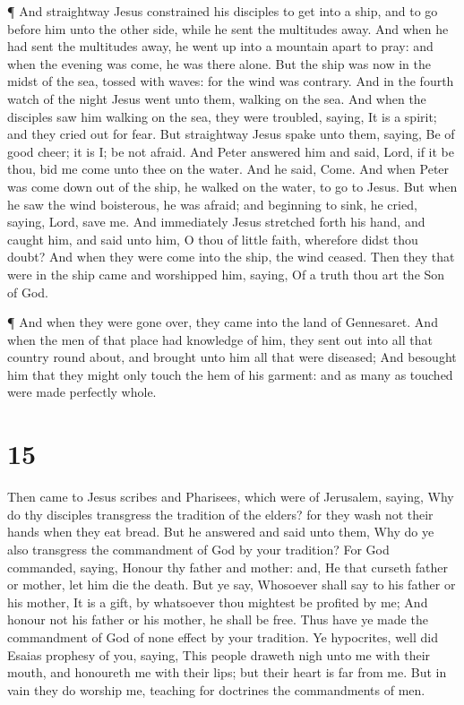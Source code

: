  ¶ And straightway Jesus constrained his disciples to get
into a ship, and to go before him unto the other side, while he sent the
multitudes away.  And when he had sent the multitudes away,
he went up into a mountain apart to pray: and when the evening was come,
he was there alone.  But the ship was now in the midst of
the sea, tossed with waves: for the wind was contrary.  And
in the fourth watch of the night Jesus went unto them, walking on the
sea.  And when the disciples saw him walking on the sea,
they were troubled, saying, It is a spirit; and they cried out for fear.
 But straightway Jesus spake unto them, saying, Be of good
cheer; it is I; be not afraid.  And Peter answered him and
said, Lord, if it be thou, bid me come unto thee on the water.
 And he said, Come. And when Peter was come down out of the
ship, he walked on the water, to go to Jesus.  But when he
saw the wind boisterous, he was afraid; and beginning to sink, he cried,
saying, Lord, save me.  And immediately Jesus stretched
forth his hand, and caught him, and said unto him, O thou of little
faith, wherefore didst thou doubt?  And when they were come
into the ship, the wind ceased.  Then they that were in the
ship came and worshipped him, saying, Of a truth thou art the Son of
God.

 ¶ And when they were gone over, they came into the land of
Gennesaret.  And when the men of that place had knowledge
of him, they sent out into all that country round about, and brought
unto him all that were diseased;  And besought him that
they might only touch the hem of his garment: and as many as touched
were made perfectly whole.

\hypertarget{section-14}{%
\section{15}\label{section-14}}

 Then came to Jesus scribes and Pharisees, which were of
Jerusalem, saying,  Why do thy disciples transgress the
tradition of the elders? for they wash not their hands when they eat
bread.  But he answered and said unto them, Why do ye also
transgress the commandment of God by your tradition?  For
God commanded, saying, Honour thy father and mother: and, He that
curseth father or mother, let him die the death.  But ye
say, Whosoever shall say to his father or his mother, It is a gift, by
whatsoever thou mightest be profited by me;  And honour not
his father or his mother, he shall be free. Thus have ye made the
commandment of God of none effect by your tradition.  Ye
hypocrites, well did Esaias prophesy of you, saying,  This
people draweth nigh unto me with their mouth, and honoureth me with
their lips; but their heart is far from me.  But in vain
they do worship me, teaching for doctrines the commandments of men.

